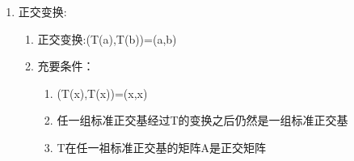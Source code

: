 \documentclass[11pt, a4paper, UTF8]{ctexart}
\begin{document}
\begin{solution}
\begin{enumerate}
\begin{enumerate}
  \end{enumerate}
\item 正交变换:
\begin{enumerate}
  \item 正交变换:(T(a),T(b))=(a,b)
  \item 充要条件：
\begin{enumerate}
  \item (T(x),T(x))=(x,x)
  \item 任一组标准正交基经过T的变换之后仍然是一组标准正交基
  \item T在任一祖标准正交基的矩阵A是正交矩阵
\end{enumerate}
\end{enumerate}
  \end{enumerate}
\end{solution}



\end{document}

